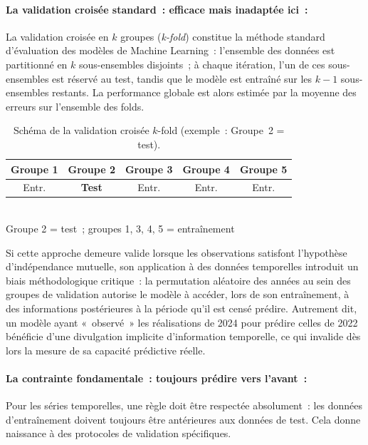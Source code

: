 \paragraph{La validation croisée standard~: efficace mais inadaptée ici~:}

La validation croisée en $k$ groupes (\textit{k-fold}) constitue la méthode standard
d'évaluation des modèles de Machine Learning~: l'ensemble des données est partitionné
en $k$ sous-ensembles disjoints~; à chaque itération, l'un de ces sous-ensembles est
réservé au test, tandis que le modèle est entraîné sur les $k-1$ sous-ensembles
restants. La performance globale est alors estimée par la moyenne des erreurs sur
l'ensemble des folds.

\begin{table}[h]
\centering
\caption{Sch\'ema de la validation crois\'ee $k$-fold (exemple~: Groupe~2 = test).}
\label{tab:kfold}
\begin{tabular}{|c|c|c|c|c|}
\hline
\textbf{Groupe 1} & \cellcolor{primary!40}\textbf{Groupe 2} & \textbf{Groupe 3} & \textbf{Groupe 4} & \textbf{Groupe 5} \\
\hline
Entr. & \textbf{Test} & Entr. & Entr. & Entr. \\
\hline
\end{tabular}\\[4pt]
{\scriptsize Groupe 2 = test~; groupes 1, 3, 4, 5 = entra\^inement}
\end{table}

Si cette approche demeure valide lorsque les observations satisfont l'hypothèse
d'indépendance mutuelle, son application à des données temporelles introduit un biais
méthodologique critique~: la permutation aléatoire des années au sein des groupes de
validation autorise le modèle à accéder, lors de son entraînement, à des informations
postérieures à la période qu'il est censé prédire. Autrement dit, un modèle ayant
«~observé~» les réalisations de 2024 pour prédire celles de 2022 bénéficie d'une
divulgation implicite d'information temporelle, ce qui invalide dès lors la mesure de
sa capacité prédictive réelle.

\paragraph{La contrainte fondamentale~: toujours prédire vers l'avant~:}

Pour les séries temporelles, une règle doit être respectée absolument~: les données
d'entraînement doivent toujours être antérieures aux données de test. Cela donne
naissance à des protocoles de validation spécifiques.

